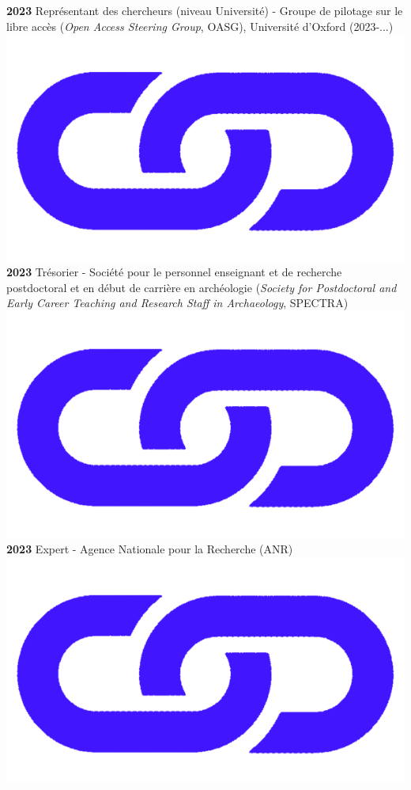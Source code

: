 \documentclass{article}
\begin{document}
\textbf{2023} Représentant des chercheurs (niveau Université) - Groupe de pilotage sur le libre accès (\textit{Open Access Steering Group}, OASG), Université d'Oxford (2023-...) \href{https://researchsupport.admin.ox.ac.uk/oasg}{\includegraphics[scale=0.02]{link_darkblue.png}}\\ 
\textbf{2023} Trésorier - Société pour le personnel enseignant et de recherche postdoctoral et en début de carrière en archéologie (\textit{Society for Postdoctoral and Early Career Teaching and Research Staff in Archaeology}, SPECTRA) \href{https://spectra.arch.ox.ac.uk/}{\includegraphics[scale=0.02]{link_darkblue.png}}\\
\textbf{2023} Expert - Agence Nationale pour la Recherche (ANR) \href{https://iris.anr.fr/}{\includegraphics[scale=0.02]{link_darkblue.png}}\\
\end{document}
